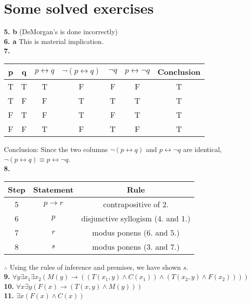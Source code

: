 \documentclass[english,openany]{book}
\begin{document}
	\section{Some solved exercises}

		\textbf{5. b} (DeMorgan's is done incorrectly)\\

	\textbf{6. a} This is material implication.\\

	\textbf{7. }

	\begin{tabular}{cc|cccc|c}
		p&q&$p \leftrightarrow q$&$\neg(p \leftrightarrow q)$&$\neg q$&$p \leftrightarrow \neg q$&Conclusion\\
		\hline
		T&T&T&F&F&F&T\\
		T&F&F&T&T&T&T\\
		F&T&F&T&F&T&T\\
		F&F&T&F&T&F&T\\
	\end{tabular}

	Conclusion: Since the two columns $\neg(p \leftrightarrow q)$ and $p \leftrightarrow \neg q$ are identical, $\neg(p \leftrightarrow q) \equiv p \leftrightarrow \neg q$.\\

	\textbf{8.}

	\begin{tabular}{c|c|c}
		Step&Statement&Rule\\
		\hline
		5&$p \rightarrow r$&contrapositive of 2.\\
		6&$p$&disjunctive syllogism (4. and 1.)\\
		7&$r$&modus ponens (6. and 5.)\\
		8&$s$&modus ponens (3. and 7.)\\
	\end{tabular}

	$\therefore$ Using the rules of inference and premises, we have shown $s$.\\

	\textbf{9.} $\forall y \exists x_1 \exists x_2 ( M(y) \rightarrow ( (T(x_1, y) \wedge C(x_1)) \wedge (T(x_2, y) \wedge F(x_2))  ))$\\

	\textbf{10.} $\forall x \exists y (F(x) \rightarrow (T(x,y) \wedge M(y)))$\\

	\textbf{11.} $\exists x (F(x) \wedge C(x))$\\
\end{document}
